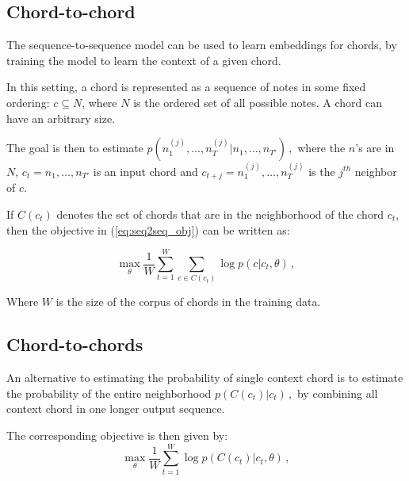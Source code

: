 \documentclass[12pt]{article}\pagestyle{myheadings}
\begin{document}
\subsection{Chord-to-chord}
The sequence-to-sequence model can be used to learn embeddings for chords, by training the model to learn the context of a given chord. 

In this setting, a chord is represented as a sequence of notes in some fixed ordering: $c \subseteq N$, where $N$ is the ordered set of all possible notes. A chord can have an arbitrary size. 

The goal is then to estimate
$
p(n^{(j)}_1, \ldots, n^{(j)}_T | n_1,\ldots,n_{T'})\,,
$
where the $n$'s are in $N$, $ c_t=n_1,\ldots,n_{T'}$ is an input chord and $c_{t+j} =n^{(j)}_1, \ldots, n^{(j)}_T$ is the $j^{th}$ neighbor of $c$.

If $C(c_t)$ denotes the set of chords that are in the neighborhood of the chord $c_t$, then the objective in (\ref{eq:seq2seq_obj}) can be written as:

\begin{equation}
\max_{\theta}  \frac{1}{W} \sum_{t=1}^{W} \sum_{c\in C(c_t)} \log p(c|c_t,\theta)\,,
\label{eq:c2c_obj}
\end{equation}

Where $W$ is the size of the corpus of chords in the training data. 


\subsection{Chord-to-chords}
An alternative to estimating the probability of single context chord is to estimate the probability of the entire neighborhood 
$
p(C(c_t) | c_t)\,,
$
by combining all context chord in one longer output sequence. 

The corresponding objective is then given by:
\begin{equation}
\max_{\theta}  \frac{1}{W} \sum_{t=1}^{W} \log p(C(c_t)|c_t,\theta)\,,
\label{eq:c2cs_obj}
\end{equation}


\newpage

 
\end{document}
